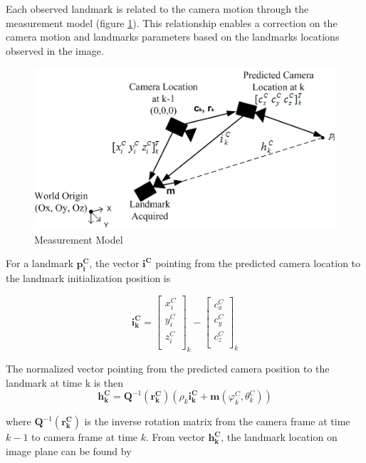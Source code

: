 Each observed landmark is related to the camera motion through the
measurement model (figure \ref{fig:measurement_model}). This
relationship enables a correction on the camera motion and landmarks
parameters based on the landmarks locations observed in the image.

\begin{figure}[h]
\centering
\includegraphics[width=12cm, keepaspectratio=true]{./Figures/measurement_model.jpg}
\caption{Measurement Model}
\label{fig:measurement_model}
\end{figure}
\FloatBarrier
For a landmark $\mathbf{p_{i}^{C}}$, the vector $\mathbf{i^{C}}$
pointing from the predicted camera location to the landmark
initialization position is

\begin{equation}
\mathbf{i_{k}^{C}}=\begin{bmatrix}
x_{i}^{C} \\
y_{i}^{C} \\
z_{i}^{C} \\
\end{bmatrix}_{k}-\begin{bmatrix}
c_{x}^{C} \\
c_{y}^{C} \\
c_{z}^{C} \\
\end{bmatrix}_{k}
\end{equation}

The normalized vector pointing from the predicted camera position to the 
landmark at time k is then 
\begin{equation}
  \mathbf{h_{k}^{C}}=\mathbf{Q}^{-1}\left(\mathbf{r_{k}^{C}}\right)
  \left(\rho_{k}\mathbf{i_{k}^{C}}+
    \mathbf{m}\left(\varphi_k^{C},\theta _{k}^{C}\right)\right)
\end{equation}

\noindent where $\mathbf{Q}^{-1}(\mathbf{r_{k}^{C}})$ is the inverse
rotation matrix from the camera frame at time $k-1$ to camera frame at
time $k$. From vector $\mathbf{h_{k}^{C}}$, the landmark location on
image plane can be found by

